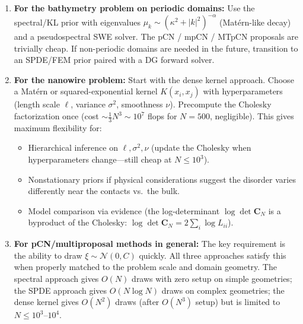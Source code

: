 \documentclass[11pt]{article}
\newcommand{\Cov}{\mathbf{C}}
\begin{document}
\begin{enumerate}[leftmargin=*]
  \item \textbf{For the bathymetry problem on periodic domains:}  Use the spectral/KL prior with eigenvalues $\mu_k \sim (\kappa^2 + |k|^2)^{-\alpha}$ (Mat\'ern-like decay) and a pseudospectral SWE solver.  The pCN / mpCN / MTpCN proposals are trivially cheap.  If non-periodic domains are needed in the future, transition to an SPDE/FEM prior paired with a DG forward solver.

  \item \textbf{For the nanowire problem:}  Start with the dense kernel approach.  Choose a Mat\'ern or squared-exponential kernel $K(x_i, x_j)$ with hyperparameters (length scale $\ell$, variance $\sigma^2$, smoothness $\nu$).  Precompute the Cholesky factorization once (cost $\sim \frac{1}{3}N^3 \sim 10^7$ flops for $N = 500$, negligible).  This gives maximum flexibility for:
  \begin{itemize}[nosep]
    \item Hierarchical inference on $\ell, \sigma^2, \nu$ (update the Cholesky when hyperparameters change---still cheap at $N \leq 10^3$).
    \item Nonstationary priors if physical considerations suggest the disorder varies differently near the contacts vs.\ the bulk.
    \item Model comparison via evidence (the log-determinant $\log\det \Cov_N$ is a byproduct of the Cholesky: $\log\det \Cov_N = 2 \sum_i \log L_{ii}$).
  \end{itemize}

  \item \textbf{For pCN/multiproposal methods in general:}  The key requirement is the ability to draw $\xi \sim \mathcal{N}(0, C)$ quickly.  All three approaches satisfy this when properly matched to the problem scale and domain geometry.  The spectral approach gives $O(N)$ draws with zero setup on simple geometries; the SPDE approach gives $O(N \log N)$ draws on complex geometries; the dense kernel gives $O(N^2)$ draws (after $O(N^3)$ setup) but is limited to $N \leq 10^3$--$10^4$.
\end{enumerate}
\end{document}
